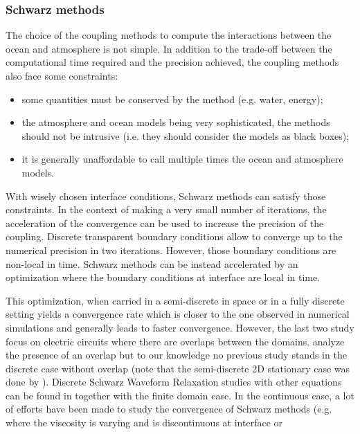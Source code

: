 \subsubsection*{Schwarz methods}
The choice of the coupling methods to compute the interactions
between the ocean and atmosphere is not simple.
In addition to the trade-off between the computational time required and
the precision achieved, the coupling methods
also face some constraints:
\begin{itemize}
	\item some quantities must be conserved by the method
		(e.g. water, energy);
	\item the atmosphere and ocean models being very
		sophisticated, the methods should not be intrusive
		(i.e. they should consider
		the models as black boxes);
	\item it is generally unaffordable to call multiple times
		the ocean and atmosphere models.
\end{itemize}
With wisely chosen interface conditions, Schwarz methods can
satisfy those constraints. In the context of making a very
small number of iterations, the acceleration of the convergence
can be used to increase the precision of the coupling.
Discrete transparent boundary conditions
\citep{zisowsky_discrete_2006} allow to converge up to the
numerical precision in two iterations.
However, those boundary conditions are non-local in time.
Schwarz methods can be instead accelerated
by an optimization \citep{gander_optimized_2006} where
the boundary conditions at interface are local in time.
\par
This optimization, when carried in a semi-discrete in space
\citep{wu_semi-discrete_2014-1} or in a fully discrete setting
\citep{wu_optimized_2017-2} yields a convergence rate which is
closer to the one observed in numerical simulations and
generally leads to faster convergence.
However, the last two study focus on electric circuits where
there are overlaps between the domains. \citep{gander_analysis_2018}
analyze the presence of an overlap but to our knowledge no previous study
stands in the discrete case without overlap (note that the
semi-discrete 2D stationary case was done by
\citep{gerardo-giorda_optimized_2005}).
Discrete Schwarz Waveform Relaxation studies with other equations
can be found in \citep{haynes_fully_2020} together with
the finite domain case.
In the continuous case, a lot of efforts have been made
to study the convergence of Schwarz methods
(e.g. \citep{thery_analysis_2021} where the viscosity
is varying and is discontinuous at interface or
